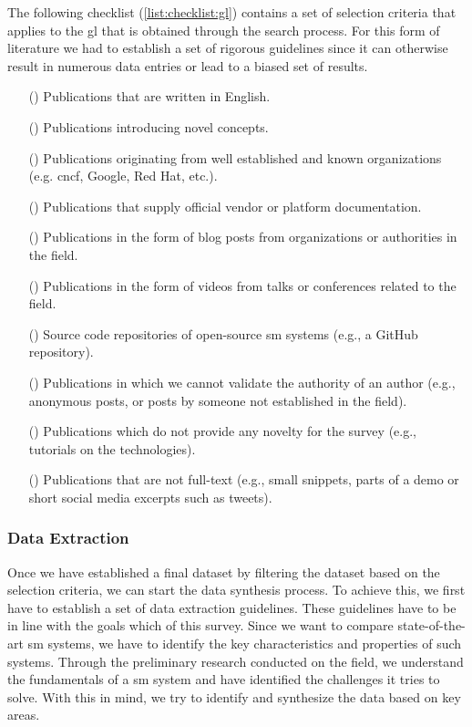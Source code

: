 The following checklist (\cref{list:checklist:gl}) contains a set of selection criteria that applies to the \gls{gl} that is obtained through the search process. For this form of literature we had to establish a set of rigorous guidelines since it can otherwise result in numerous data entries or lead to a biased set of results. 

\begin{itemize}
    \item[(\cmark)] Publications that are written in English.
    \item[(\cmark)] Publications introducing novel concepts.
    \item[(\cmark)] Publications originating from well established and known organizations (e.g. \gls{cncf}, Google, Red Hat, etc.).
    \item[(\cmark)] Publications that supply official vendor or platform documentation.
    \item[(\cmark)] Publications in the form of blog posts from organizations or authorities in the field.
    \item[(\cmark)] Publications in the form of videos from talks or conferences related to the field.
    \item[(\cmark)] Source code repositories of open-source \gls{sm} systems (e.g., a GitHub repository).
    
    \item[(\xmark)] Publications in which we cannot validate the authority of an author (e.g., anonymous posts, or posts by someone not established in the field). 
    \item[(\xmark)] Publications which do not provide any novelty for the survey (e.g., tutorials on the technologies). 
    \item[(\xmark)] Publications that are not full-text (e.g., small snippets, parts of a demo or short social media excerpts such as tweets).
    
    \label{list:checklist:gl}
\end{itemize}


\subsubsection{Data Extraction}
\label{sec:survey:methodology:review-protocol:data-extraction}


Once we have established a final dataset by filtering the dataset based on the selection criteria, we can start the data synthesis process. To achieve this, we first have to establish a set of data extraction guidelines. These guidelines have to be in line with the goals which of this survey. Since we want to compare  state-of-the-art \gls{sm} systems, we have to identify the key characteristics and properties  of such systems. Through the preliminary research conducted on the field, we understand the fundamentals of a \gls{sm} system and have identified the challenges it tries to solve. With this in mind, we try to identify and synthesize the data based on key areas.


